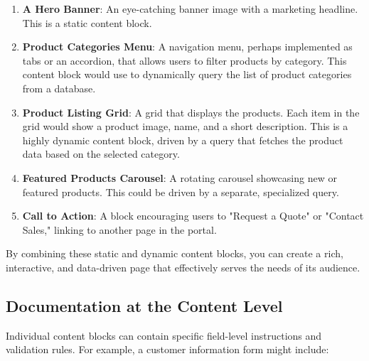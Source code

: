 \begin{enumerate}
    \item \textbf{A Hero Banner}: An eye-catching banner image with a marketing headline. This is a static content block.
    \item \textbf{Product Categories Menu}: A navigation menu, perhaps implemented as tabs or an accordion, that allows users to filter products by category. This content block would use \wbpl{} to dynamically query the list of product categories from a database.
    \item \textbf{Product Listing Grid}: A grid that displays the products. Each item in the grid would show a product image, name, and a short description. This is a highly dynamic content block, driven by a \wbpl{} query that fetches the product data based on the selected category.
    \item \textbf{Featured Products Carousel}: A rotating carousel showcasing new or featured products. This could be driven by a separate, specialized query.
    \item \textbf{Call to Action}: A block encouraging users to "Request a Quote" or "Contact Sales," linking to another page in the portal.
\end{enumerate}

By combining these static and dynamic content blocks, you can create a rich, interactive, and data-driven page that effectively serves the needs of its audience.

\subsection{Documentation at the Content Level}
\label{sec:content-documentation}

Individual content blocks can contain specific field-level instructions and validation rules. For example, a customer information form might include:

